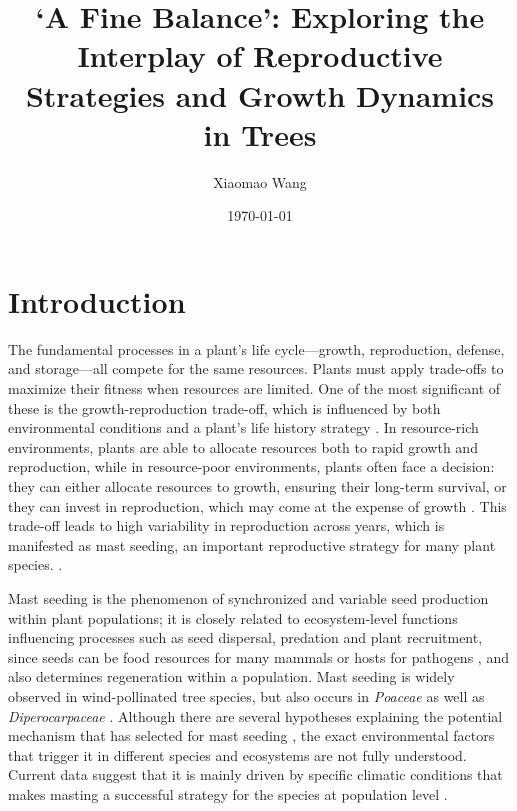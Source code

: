 \documentclass[11pt,letter]{article}
\begin{document}
\title{`A Fine Balance': Exploring the Interplay of Reproductive Strategies and Growth Dynamics in Trees}
\author{Xiaomao Wang} 
\date{\today}
\maketitle

\setlength{\parindent}{0pt}
\setlength{\parskip}{3pt}


\section{Introduction} 
The fundamental processes in a plant's life cycle—growth, reproduction, defense, and storage—all compete for the same resources. Plants must apply trade-offs to maximize their fitness when resources are limited. One of the most significant of these is the growth-reproduction trade-off, which is influenced by both environmental conditions and a plant's life history strategy \citep{grime1977evidence, stearns1998evolution}. In resource-rich environments, plants are able to allocate resources both to rapid growth and reproduction, while in resource-poor environments, plants often face a decision: they can either allocate resources to growth, ensuring their long-term survival, or they can invest in reproduction, which may come at the expense of growth \citep{bazzaz1997allocation}. This trade-off leads to high variability in reproduction across years, which is manifested as mast seeding, an important reproductive strategy for many plant species. \citep{pearse2016mechanisms}.\par
Mast seeding is the phenomenon of synchronized and variable seed production within plant populations; it is closely related to ecosystem-level functions influencing processes such as seed dispersal, predation and plant recruitment, since seeds can be food resources for many mammals or hosts for pathogens  \citep{davies2024seed, janzen1971seed, kelly1994evolutionary}, and also determines regeneration within a population. Mast seeding is widely observed in wind-pollinated tree species, but also occurs in \textit{Poaceae} as well as \textit{Diperocarpaceae} \citep{kelly2002mast}. Although there are several hypotheses explaining the potential mechanism that has selected for mast seeding  \citep[e.g., predator satiation, resource matching, \textit{etc.}, discussed more in Chapter 2,][]{koenig2021brief}, the exact environmental factors that trigger it in different species and ecosystems are not fully understood. Current data suggest that it is mainly driven by specific climatic conditions that makes masting a successful strategy for the species at population level  \citep{pearse2016mechanisms}. \\
\end{document}
